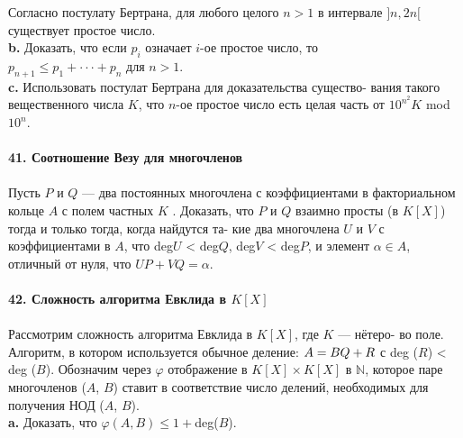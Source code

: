 \noindent\hspace*{10pt}Согласно постулату Бертрана, для любого целого $n > 1$ в интервале\linebreak
$]n, 2n[$ существует простое число.\\
\hspace*{10pt}\textbf{b.} Доказать, что если $p_i$ означает $i$-ое простое число, то\\
$p_{n+1}\leq p_1+\cdot\cdot\cdot+p_n$ для $n>1$.\\
\hspace*{10pt}\textbf{c.} Использовать постулат Бертрана для доказательства существо-\linebreak
вания такого вещественного числа $K$, что $n$-ое простое число есть целая\linebreak
часть от $10^{n{^2}} K$ mod $10^n$.
\\
\\
\noindent\textbf{41. Соотношение Везу для многочленов}\\\\
\hspace*{10pt}Пусть $P$ и $Q$ — два постоянных многочлена с коэффициентами в\linebreak
факториальном кольце $A$ с полем частных $K$ . Доказать, что $P$ и $Q$\linebreak
взаимно просты (в $K [X]$) тогда и только тогда, когда найдутся та-\linebreak
кие два многочлена $U$ и $V$ с коэффициентами в $A$, что deg$U$ < deg$Q$,\linebreak
deg$V$ < deg$P$, и элемент $\alpha \in A$, отличный от нуля, что $UP + VQ = \alpha.$
\\
\\
\noindent\textbf{42. Сложность алгоритма Евклида в $K[X]$}\\\\
\hspace*{10pt}Рассмотрим сложность алгоритма Евклида в $K[X]$, где $K$ — нётеро-\linebreak
во поле. Алгоритм, в котором используется обычное деление: $A = BQ +\linebreak
R$ с deg ($R$) < deg ($B$). Обозначим через $\varphi$ отображение в $K[X] \times K[X]$ в $\mathbb{N}$,\linebreak
которое паре многочленов ($A$, $B$) ставит в соответствие число делений,\linebreak
необходимых для получения НОД ($A$, $B$).\\
\hspace*{10pt}\textbf{a.} Доказать, что $\varphi (A,B)\leq 1 + $deg($B$).\\
